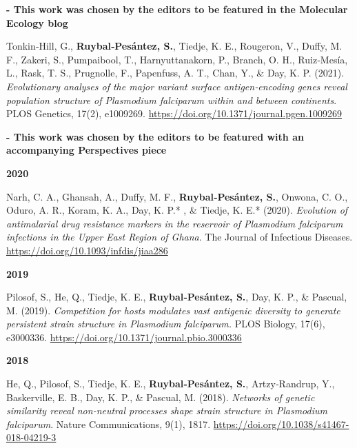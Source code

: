 \documentclass[11pt,a4paper,]{awesome-cv}
\begin{document}
\textbf{- This work was chosen by the editors to be featured in the
Molecular Ecology blog
\href{https://molecularecologyblog.com/2021/09/01/interview-with-the-authors-does-indoor-spraying-alter-the-genetic-diversity-of-malaria-causing-parasites-and-what-does-this-mean-for-long-term-control/}{\faExternalLink}}

\setlength{\leftskip}{1cm}

Tonkin‐Hill, G., \textbf{Ruybal‐Pesántez, S.}, Tiedje, K. E., Rougeron,
V., Duffy, M. F., Zakeri, S., Pumpaibool, T., Harnyuttanakorn, P.,
Branch, O. H., Ruiz‐Mesía, L., Rask, T. S., Prugnolle, F., Papenfuss, A.
T., Chan, Y., \& Day, K. P. (2021). \emph{Evolutionary analyses of the
major variant surface antigen‐encoding genes reveal population structure
of Plasmodium falciparum within and between continents}. PLOS Genetics,
17(2), e1009269. \url{https://doi.org/10.1371/journal.pgen.1009269}

\setlength{\leftskip}{2cm}

\textbf{- This work was chosen by the editors to be featured with an
accompanying Perspectives piece
\href{https://doi.org/10.1371/journal.pgen.1009344}{\faExternalLink}}

\setlength{\leftskip}{0cm}

\textbf{2020}

\setlength{\leftskip}{1cm}

Narh, C. A., Ghansah, A., Duffy, M. F., \textbf{Ruybal‐Pesántez, S.},
Onwona, C. O., Oduro, A. R., Koram, K. A., Day, K. P.* , \& Tiedje, K.
E.* (2020). \emph{Evolution of antimalarial drug resistance markers in
the reservoir of Plasmodium falciparum infections in the Upper East
Region of Ghana}. The Journal of Infectious Diseases.
\url{https://doi.org/10.1093/infdis/jiaa286}

\setlength{\leftskip}{0cm}

\textbf{2019}

\setlength{\leftskip}{1cm}

Pilosof, S., He, Q., Tiedje, K. E., \textbf{Ruybal‐Pesántez, S.}, Day,
K. P., \& Pascual, M. (2019). \emph{Competition for hosts modulates vast
antigenic diversity to generate persistent strain structure in
Plasmodium falciparum.} PLOS Biology, 17(6), e3000336.
\url{https://doi.org/10.1371/journal.pbio.3000336}

\setlength{\leftskip}{0cm}

\textbf{2018}

\setlength{\leftskip}{1cm}

He, Q., Pilosof, S., Tiedje, K. E., \textbf{Ruybal‐Pesántez, S.},
Artzy‐Randrup, Y., Baskerville, E. B., Day, K. P., \& Pascual, M.
(2018). \emph{Networks of genetic similarity reveal non‐neutral
processes shape strain structure in Plasmodium falciparum}. Nature
Communications, 9(1), 1817.
\url{https://doi.org/10.1038/s41467-018-04219-3}
\end{document}

